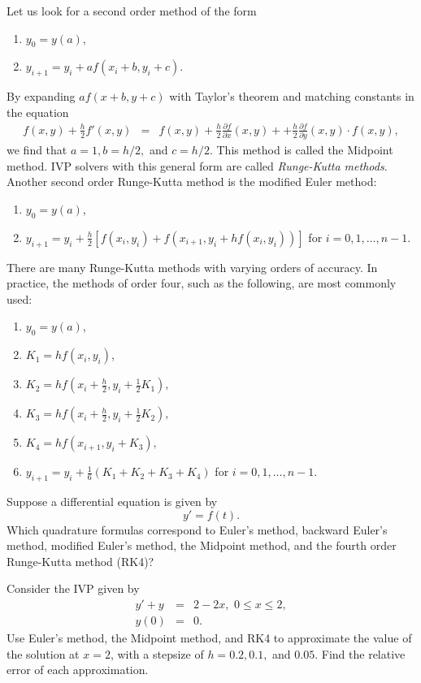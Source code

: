 Let us look for a second order method of the form 
\begin{enumerate}
\item $y_0 = y(a)$,
\item $y_{i+1} = y_i + a f(x_i+b, y_i+c)$.
\end{enumerate}
By expanding $a f(x+b, y+c)$ with Taylor's theorem and matching constants in the equation
\begin{eqnarray*}
f(x,y) + \frac{h}{2}f'(x,y) &=& f(x,y) + \frac{h}{2}\frac{\partial f}{\partial x}(x,y) +  + \frac{h}{2}\frac{\partial f}{\partial y}(x,y) \cdot f(x,y),
\end{eqnarray*}
we find that $a = 1, b = h/2,$ and $c = h/2$. This method is called the Midpoint method. IVP solvers with this general form are called \textit{Runge-Kutta methods}. Another second order Runge-Kutta method is the modified Euler method: 
\begin{enumerate}
\item $y_0 = y(a)$,
\item $y_{i+1} = y_i + \frac{h}{2}[ f(x_i, y_i) + f(x_{i+1}, y_i+ hf(x_i, y_i))]$ for $i = 0,1,\hdots, n-1$. 
\end{enumerate}

There are many Runge-Kutta methods with varying orders of accuracy. In practice, the methods of order four, such as the following, are most commonly used: 
\begin{enumerate}
\item $y_0 = y(a)$, 
\item $K_1 = hf(x_i,y_i)$,
\item $K_2 = hf(x_i + \frac{h}{2}, y_i + \frac{1}{2} K_1),$
\item $K_3 = hf(x_i + \frac{h}{2} , y_i + \frac{1}{2} K_2),$
\item $K_4 = hf(x_{i+1} , y_i +  K_3),$
\item $y_{i+1} = y_i + \frac{1}{6}(K_1 + K_2 + K_3 + K_4)$ for $i = 0,1,\hdots,n-1$.
\end{enumerate}




\begin{problem}
Suppose a differential equation is given by
\[ y' = f(t).\]
Which quadrature formulas correspond to Euler's method, backward Euler's method, modified Euler's method, the Midpoint method, and the fourth order Runge-Kutta method (RK4)? 
\end{problem}


\begin{problem}
Consider the IVP given by 
\begin{eqnarray*}
y' + y &=& 2-2x,\,\, 0 \leq x \leq 2, \\
y(0) &=& 0.
\end{eqnarray*}
Use Euler's method, the Midpoint method, and RK4 to approximate the value of the solution at $x = 2$, with a stepsize of $h = 0.2, 0.1,$ and $0.05 $. Find the relative error of each approximation.
\end{problem}






